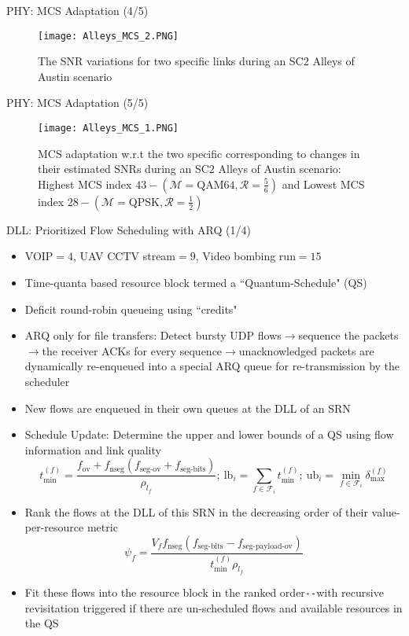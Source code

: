 \documentclass{beamer}
\begin{document}
\begin{frame}{PHY: MCS Adaptation (4/5)}
\begin{figure}
    \centering
    \texttt{[image: Alleys\_MCS\_2.PNG]}
    \caption{The SNR variations for two specific links during an SC$2$ Alleys of Austin scenario}
    \label{fig:9}
\end{figure}
\end{frame}
\begin{frame}{PHY: MCS Adaptation (5/5)}
\begin{figure}
    \centering
    \texttt{[image: Alleys\_MCS\_1.PNG]}
    \caption{MCS adaptation w.r.t the two specific corresponding to changes in their estimated SNRs during an SC$2$ Alleys of Austin scenario: Highest MCS index $43{-}(\mathcal{M}{=}\text{QAM}64,\mathcal{R}{=}\frac{5}{6})$ and Lowest MCS index $28{-}(\mathcal{M}{=}\text{QPSK},\mathcal{R}{=}\frac{1}{2})$}
    \label{fig:10}
\end{figure}
\end{frame}
\begin{frame}{DLL: Prioritized Flow Scheduling with ARQ (1/4)}
    \footnotesize{\begin{itemize}
        \item VOIP${=}4$, UAV CCTV stream${=}9$, Video bombing run${=}15$ 
        \item Time-quanta based resource block termed a ``Quantum-Schedule" (QS)
        \item Deficit round-robin queueing using ``credits"
        \item ARQ only for file transfers: Detect bursty UDP flows$\longrightarrow$sequence the packets$\longrightarrow$the receiver ACKs for every sequence$\longrightarrow$unacknowledged packets are dynamically re-enqueued into a special ARQ queue for re-transmission by the scheduler
        \item New flows are enqueued in their own queues at the DLL of an SRN
        \item Schedule Update: Determine the upper and lower bounds of a QS using flow information and link quality
        \[t_{\text{min}}^{(f)}=\frac{f_{\text{ov}}+f_{\text{nseg}}(f_{\text{seg-ov}}+f_{\text{seg-bits}})}{\rho_{l_{f}}};\ \text{lb}_{i}=\sum_{f \in \mathcal{F}_{i}}t_{\text{min}}^{(f)};\ \text{ub}_{i}=\min_{f \in \mathcal{F}_{i}}\delta_{\text{max}}^{(f)}\]
        \item Rank the flows at the DLL of this SRN in the decreasing order of their value-per-resource metric
        \[\psi_{f}=\frac{V_{f}f_{\text{nseg}}(f_{\text{seg-bits}}-f_{\text{seg-payload-ov}})}{t_{\text{min}}^{(f)}\rho_{l_{f}}}\]
        \item Fit these flows into the resource block in the ranked order\texttt{-{}-}with recursive revisitation triggered if there are un-scheduled flows and available resources in the QS
    \end{itemize}}
\end{frame}
\end{document}
